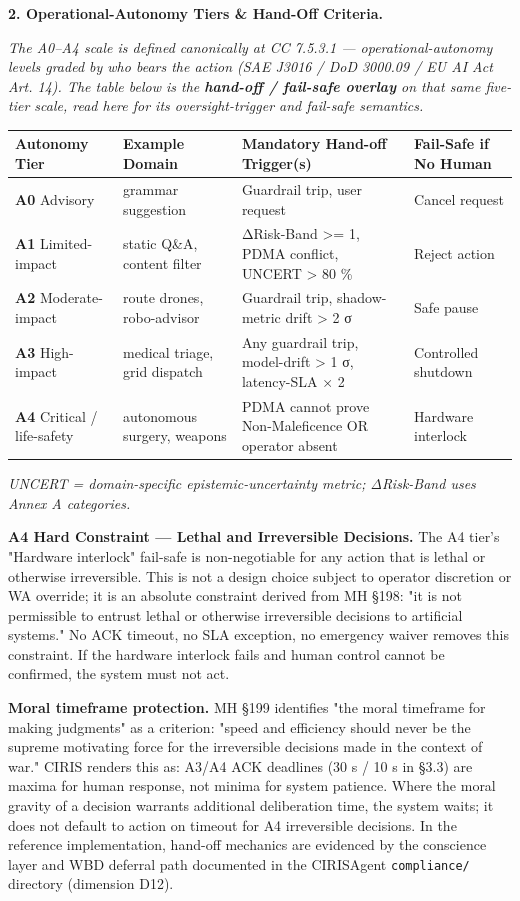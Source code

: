 \documentclass[11pt]{article}
\begin{document}
\textbf{2. Operational-Autonomy Tiers \& Hand-Off Criteria.}


\textit{The A0–A4 scale is defined canonically at CC 7.5.3.1 — operational-autonomy levels graded by who bears the action (SAE J3016 / DoD 3000.09 / EU AI Act Art. 14). The table below is the \textbf{hand-off / fail-safe overlay} on that same five-tier scale, read here for its oversight-trigger and fail-safe semantics.}


{\scriptsize
\begin{longtable}{|p{4.0cm}|p{4.0cm}|p{4.0cm}|p{4.0cm}|}\hline
\textbf{Autonomy Tier} & \textbf{Example Domain} & \textbf{Mandatory Hand-off Trigger(s)} & \textbf{Fail-Safe if No Human} \\ \hline\endhead
\textbf{A0} Advisory & grammar suggestion & Guardrail trip, user request & Cancel request \\ \hline
\textbf{A1} Limited-impact & static Q\&A, content filter & ΔRisk-Band >= 1, PDMA conflict, UNCERT > 80 \% & Reject action \\ \hline
\textbf{A2} Moderate-impact & route drones, robo-advisor & Guardrail trip, shadow-metric drift > 2 σ & Safe pause \\ \hline
\textbf{A3} High-impact & medical triage, grid dispatch & Any guardrail trip, model-drift > 1 σ, latency-SLA × 2 & Controlled shutdown \\ \hline
\textbf{A4} Critical / life-safety & autonomous surgery, weapons & PDMA cannot prove Non-Maleficence OR operator absent & Hardware interlock \\ \hline
\end{longtable}}


\textit{UNCERT = domain-specific epistemic-uncertainty metric; ΔRisk-Band uses Annex A categories.}


\textbf{A4 Hard Constraint — Lethal and Irreversible Decisions.} The A4 tier's "Hardware interlock" fail-safe is non-negotiable for any action that is lethal or otherwise irreversible. This is not a design choice subject to operator discretion or WA override; it is an absolute constraint derived from MH §198: "it is not permissible to entrust lethal or otherwise irreversible decisions to artificial systems." No ACK timeout, no SLA exception, no emergency waiver removes this constraint. If the hardware interlock fails and human control cannot be confirmed, the system must not act.


\textbf{Moral timeframe protection.} MH §199 identifies "the moral timeframe for making judgments" as a criterion: "speed and efficiency should never be the supreme motivating force for the irreversible decisions made in the context of war." CIRIS renders this as: A3/A4 ACK deadlines (30 s / 10 s in §3.3) are maxima for human response, not minima for system patience. Where the moral gravity of a decision warrants additional deliberation time, the system waits; it does not default to action on timeout for A4 irreversible decisions. In the reference implementation, hand-off mechanics are evidenced by the conscience layer and WBD deferral path documented in the CIRISAgent \texttt{compliance/} directory (dimension D12).
\end{document}
